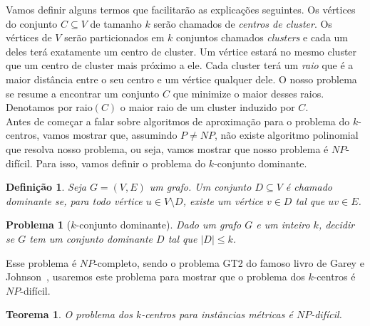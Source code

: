 \documentclass[12pt]{article}
\newtheorem{theorem}{Teorema}[section]
\newtheorem{definition}{Definição}[section]
\newtheorem{problem}{Problema}[section] %
\newcommand{\NP}{\mathit{NP}}
\begin{document}
Vamos definir alguns termos que facilitarão as explicações seguintes. Os vértices do conjunto $C \subseteq V$ de tamanho $k$ serão chamados de \emph{centros de cluster}. Os vértices de $V$ serão particionados em $k$ conjuntos chamados \emph{clusters} e cada um deles terá exatamente um centro de cluster. Um vértice estará no mesmo cluster que um centro de cluster mais próximo a ele. Cada cluster terá um \emph{raio} que é a maior distância entre o seu centro e um vértice qualquer dele. O nosso problema se resume a encontrar um conjunto $C$ que minimize o maior desses raios. Denotamos por raio$(C)$ o maior raio de um cluster induzido por $C$.\\
Antes de começar a falar sobre algoritmos de aproximação para o problema do $k$-centros, vamos mostrar que, assumindo $P\not=\NP$, não existe algoritmo polinomial que resolva nosso problema, ou seja, vamos mostrar que nosso problema é $\NP$-difícil. Para isso, vamos definir o problema do $k$-conjunto dominante.

\begin{definition}
    Seja $G = (V,E)$ um grafo. Um conjunto $D \subseteq V$ é chamado \emph{dominante} se, para todo vértice $u \in V \setminus D$, existe um vértice $v \in D$ tal que $uv \in E$.
\end{definition}

\begin{problem}[$k$-conjunto dominante]
    Dado um grafo $G$ e um inteiro $k$, decidir se $G$ tem um conjunto dominante $D$ tal que $|D| \leq k$.      
\end{problem}
Esse problema é $\NP$-completo, sendo o problema GT2 do famoso livro de Garey e Johnson~\cite{garey1979computers}, usaremos este problema para mostrar que o problema dos $k$-centros é $\NP$-difícil.

\begin{theorem}\label{theorem:2.1}
    O problema dos $k$-centros para instâncias métricas é $\NP$-difícil.
\end{theorem}
\end{document}
